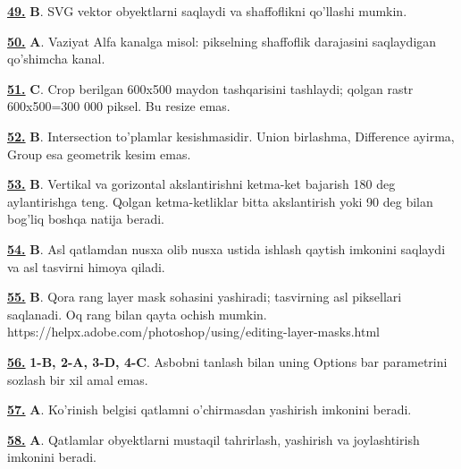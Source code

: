 \documentclass[10pt,a4paper,oneside]{article}
\begin{document}
\noindent\hyperlink{q49}{\textbf{49.}} \textbf{B}.  SVG vektor obyektlarni saqlaydi va shaffoflikni qo'llashi mumkin.
\par\vspace{3mm}
\noindent\hyperlink{q50}{\textbf{50.}} \textbf{A}.  Vaziyat Alfa kanalga misol: pikselning shaffoflik darajasini saqlaydigan qo'shimcha kanal.
\par\vspace{3mm}
\noindent\hyperlink{q51}{\textbf{51.}} \textbf{C}.  Crop berilgan 600x500 maydon tashqarisini tashlaydi; qolgan rastr 600x500=300 000 piksel. Bu resize emas.
\par\vspace{3mm}
\noindent\hyperlink{q52}{\textbf{52.}} \textbf{B}.  Intersection to'plamlar kesishmasidir. Union birlashma, Difference ayirma, Group esa geometrik kesim emas.
\par\vspace{3mm}
\noindent\hyperlink{q53}{\textbf{53.}} \textbf{B}.  Vertikal va gorizontal akslantirishni ketma-ket bajarish 180 deg  aylantirishga teng. Qolgan ketma-ketliklar bitta akslantirish yoki 90 deg  bilan bog'liq boshqa natija beradi.
\par\vspace{3mm}
\noindent\hyperlink{q54}{\textbf{54.}} \textbf{B}.  Asl qatlamdan nusxa olib nusxa ustida ishlash qaytish imkonini saqlaydi va asl tasvirni himoya qiladi.
\par\vspace{3mm}
\noindent\hyperlink{q55}{\textbf{55.}} \textbf{B}.  Qora rang layer mask sohasini yashiradi; tasvirning asl piksellari saqlanadi. Oq rang bilan qayta ochish mumkin. https://helpx.adobe.com/photoshop/using/editing-layer-masks.html
\par\vspace{3mm}
\noindent\hyperlink{q56}{\textbf{56.}} \textbf{1-B, 2-A, 3-D, 4-C}.  Asbobni tanlash bilan uning Options bar parametrini sozlash bir xil amal emas.
\par\vspace{3mm}
\noindent\hyperlink{q57}{\textbf{57.}} \textbf{A}.  Ko'rinish belgisi qatlamni o'chirmasdan yashirish imkonini beradi.
\par\vspace{3mm}
\noindent\hyperlink{q58}{\textbf{58.}} \textbf{A}.  Qatlamlar obyektlarni mustaqil tahrirlash, yashirish va joylashtirish imkonini beradi.
\end{document}
